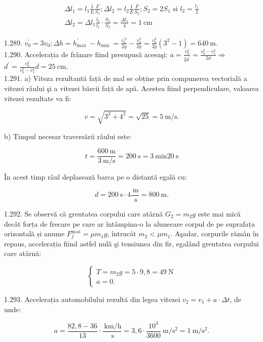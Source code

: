 $$
\begin{gathered}
\Delta l_{1}=l_{1} \frac{1}{E} \frac{F}{S_{1}} ; \Delta l_{2}=l_{2} \frac{1}{E} \frac{F}{S_{2}} ; S_{2}=2 S_{1} \text { si } l_{2}=\frac{l_{1}}{2} \\
\Delta l_{2}=\Delta l_{1} \frac{l_{2}}{l_{1}} \cdot \frac{S_{1}}{S_{2}}=\frac{\Delta l_{1}}{4}=1 \mathrm{~cm}
\end{gathered}
$$

1.289. $v_{0}^{\prime}=3 v_{0} ; \Delta h=h_{\text {max }}^{\prime}-h_{\text {min }}=\frac{v_{0}^{\prime 2}}{2 g}-\frac{v_{0}^{2}}{2 g}=\frac{v_{0}^{2}}{2 g}\left(3^{2}-1\right)=640 \mathrm{~m}$.\\
1.290. Accelerația de frânare fiind presupusã aceeaşi: $a=\frac{v_{0}^{2}}{2 d^{\prime}}=\frac{v_{0}^{2}-v_{1}^{2}}{2 d} \Rightarrow$ $d^{\prime}=\frac{v_{0}^{2}}{v_{0}^{2}-v_{1}^{2}} d=25 \mathrm{~cm}$.\\
1.291. a) Viteza rezultantă față de mal se obține prin compunerea vectorială a vitezei râului şi a vitezei bărcii față de apă. Acestea fiind perpendiculare, valoarea vitezei rezultate va fi:

$$
v=\sqrt{3^{2}+4^{2}}=\sqrt{25}=5 \mathrm{~m} / \mathrm{s} .
$$

b) Timpul necesar traversării râului este:

$$
t=\frac{600 \mathrm{~m}}{3 \mathrm{~m} / \mathrm{s}}=200 \mathrm{~s}=3 \mathrm{~min} 20 \mathrm{~s}
$$

În acest timp râul deplasează barca pe o distantă egală cu:

$$
d=200 \mathrm{~s} \cdot 4 \frac{\mathrm{~m}}{\mathrm{~s}}=800 \mathrm{~m} .
$$

1.292. Se observă că greutatea corpului care atârnă $G_{2}=m_{2} g$ este mai mică decât forța de frecare pe care ar întâmpina-o la alunecare corpul de pe suprafața orizontală și anume $F_{f}^{\max }=\mu m_{1} g$, întrucât $m_{2}<\mu m_{1}$. Aşadar, corpurile rămân în repaus, accelerația fiind astfel nulă şi tensiunea din fir, egalând greutatea corpului care atârnă:

$$
\left\{\begin{array}{l}
T=m_{2} g=5 \cdot 9,8=49 \mathrm{~N} \\
a=0 .
\end{array}\right.
$$

1.293. Accelerația automobilului rezultă din legea vitezei $v_{2}=v_{1}+a \cdot \Delta t$, de unde:

$$
a=\frac{82,8-36}{13} \cdot \frac{\mathrm{~km} / \mathrm{h}}{\mathrm{~s}}=3,6 \cdot \frac{10^{3}}{3600} \mathrm{~m} / \mathrm{s}^{2}=1 \mathrm{~m} / \mathrm{s}^{2} .
$$

